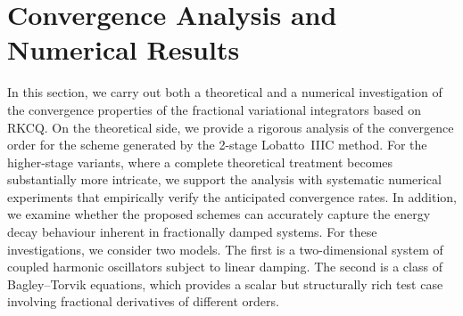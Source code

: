\documentclass[a4paper,10pt,reqno]{amsart}
\theoremstyle{definition}
\begin{document}
\section{Convergence Analysis and Numerical Results}\label{sec:numericalresult}
In this section, we carry out both a theoretical and a numerical investigation of the convergence properties of the fractional variational integrators based on RKCQ. On the theoretical side, we provide a rigorous analysis of the convergence order for the scheme generated by the 2-stage Lobatto~IIIC method. For the higher-stage variants, where a complete theoretical treatment becomes substantially more intricate, we support the analysis with systematic numerical experiments that empirically verify the anticipated convergence rates. In addition, we examine whether the proposed schemes can accurately capture the energy decay behaviour inherent in fractionally damped systems. For these investigations, we consider two models. The first is a two-dimensional system of coupled harmonic oscillators subject to linear damping. The second is a class of Bagley–Torvik equations, which provides a scalar but structurally rich test case involving fractional derivatives of different orders.
\end{document}
